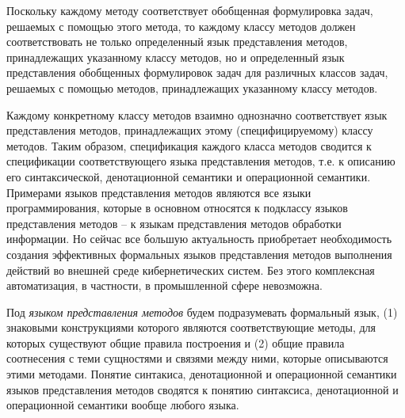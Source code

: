 \begin{itemize}
\begin{SCn}
\begin{scnindent}
\end{scnindent}
\begin{scnindent}
\end{scnindent}
\end{SCn}

Поскольку каждому методу соответствует обобщенная формулировка задач, решаемых с помощью этого метода, то каждому классу
методов должен соответствовать не только определенный язык представления методов, принадлежащих указанному классу
методов, но и определенный язык представления обобщенных формулировок задач для различных классов задач, решаемых с
помощью методов, принадлежащих указанному классу методов.

Каждому конкретному классу методов взаимно однозначно соответствует язык представления методов, принадлежащих этому
(специфицируемому) классу методов. Таким образом, спецификация каждого класса методов сводится к спецификации
соответствующего языка представления методов, т.е. к описанию его синтаксической, денотационной семантики и операционной
семантики. Примерами языков представления методов являются все языки программирования, которые в основном относятся к
подклассу языков представления методов – к языкам представления методов обработки информации. Но сейчас все большую
актуальность приобретает необходимость создания эффективных формальных языков представления методов выполнения действий
во внешней среде кибернетических систем. Без этого комплексная автоматизация, в частности, в промышленной сфере
невозможна.

Под \textit{языком представления методов} будем подразумевать формальный язык, (1) знаковыми конструкциями которого
являются соответствующие методы, для которых существуют общие правила построения и (2) общие правила соотнесения с теми
сущностями и связями между ними, которые описываются этими методами. Понятие синтакиса, денотационной и операционной
семантики языков представления методов сводятся к понятию синтаксиса, денотационной и операционной семантики вообще
любого языка.


\end{itemize}
